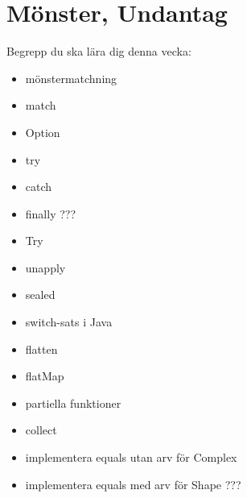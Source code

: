 \chapter{Mönster, Undantag}\label{chapter:W08}
Begrepp du ska lära dig denna vecka:
\begin{multicols}{2}\begin{itemize}[nosep,label={$\square$},leftmargin=*]
\item mönstermatchning
\item match
\item Option
\item try
\item catch
\item finally ???
\item Try
\item unapply
\item sealed
\item switch-sats i Java
\item flatten
\item flatMap
\item partiella funktioner
\item collect
\item implementera equals utan arv för Complex
\item implementera equals med arv för Shape ???\end{itemize}\end{multicols}

